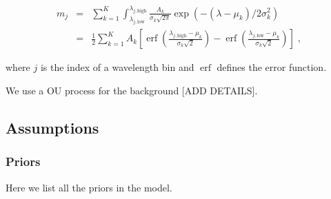 \documentclass[12pt]{emulateapj}
\newcommand{\mean}{m}
\DeclareMathOperator\erf{erf}
\begin{document}
\begin{eqnarray}
\mean_j & = &  \sum_{k=1}^{K}{\int^{\lambda_{j,\mathrm{high}}}_{\lambda_{j, \mathrm{low}}}{\frac{A_k}{\sigma_k\sqrt{2\pi}} \exp{(-(\lambda-\mu_k)/{2\sigma_k^2})}}} \\ \nonumber
& = & \frac{1}{2}\sum_{k=1}^{K} A_k\left[ \erf{\left( \frac{\lambda_{j,\mathrm{high}} - \mu_k}{\sigma_k\sqrt{2}}\right)} - \erf{\left( \frac{\lambda_{j, \mathrm{low}} - \mu_k}{\sigma_k\sqrt{2}}\right)} \right] \; ,
\end{eqnarray}

\noindent where $j$ is the index of a wavelength bin and $\erf$ defines the error function. 

We use a OU process for the background [ADD DETAILS].

 


\subsection{Assumptions}

\subsubsection{Priors}

Here we list all the priors in the model.
\end{document}
